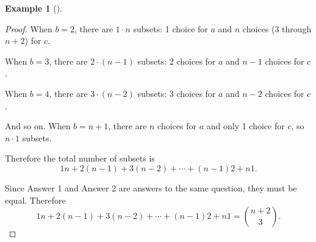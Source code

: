 \documentclass[10pt,]{book}
\theoremstyle{plain}
\theoremstyle{definition}
\newtheorem{example}[theorem]{Example}
\theoremstyle{definition}
\theoremstyle{definition}
\numberwithin{equation}{chapter}
\begin{document}
\begin{example}[]
\begin{proof}
            When \(b = 2\), there are \(1 \cdot n\) subsets: 1 choice for \(a\) and \(n\) choices (3 through \(n+2\)) for \(c\).
\par

            When \(b = 3\), there are \(2 \cdot (n-1)\) subsets: 2 choices for \(a\) and \(n-1\) choices for \(c\).
\par

            When \(b = 4\), there are \(3 \cdot (n-2)\) subsets: 3 choices for \(a\) and \(n-2\) choices for \(c\).
\par

            And so on. When \(b = n+1\), there are \(n\) choices for \(a\) and only 1 choice for \(c\), so \(n \cdot 1\) subsets.
\par

            Therefore the total number of subsets is
            \begin{equation*}
              1 n + 2 (n-1) + 3 (n-2) + \cdots + (n-1)2 + n 1.
            \end{equation*}
\par

            Since Answer 1 and Answer 2 are answers to the same question, they must be equal. Therefore
            \begin{equation*}
              1 n + 2 (n-1) + 3 (n-2) + \cdots + (n-1) 2 + n 1 = {n+2 \choose 3}.
            \end{equation*}
\end{proof}
\end{example}
\end{document}

